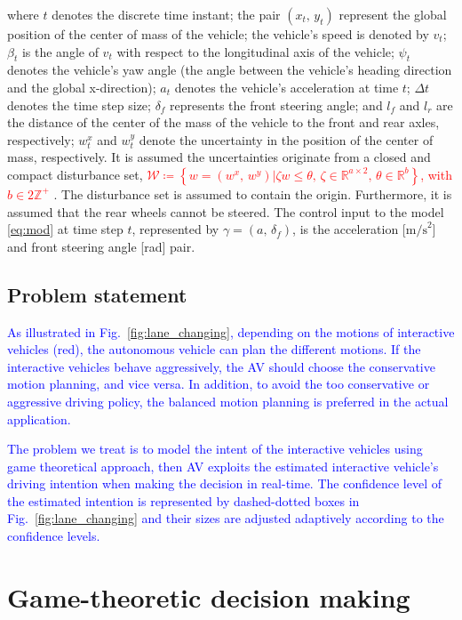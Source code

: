 \documentclass[10pt,journal]{IEEEtran}
\begin{document}
	
	\noindent where  $t$ denotes the discrete time instant; the pair $\left(x_t,\,y_t\right)$  represent the global position of the center of mass of the vehicle; the vehicle's speed is denoted by $v_t$; $\beta_t$ is the angle of $v_t$ with respect to the longitudinal axis of the vehicle; $\psi_t$ denotes the vehicle’s yaw angle (the angle between the vehicle’s heading direction and the global x-direction); $a_t$ denotes the vehicle’s acceleration at time $t$;  $\Delta t$ denotes the time step size; $\delta_f$  represents the front steering angle; and  $l_f$  and $l_r$  are the distance of the center of the mass of the vehicle to the front and rear axles, respectively; $w^x_t$  and $w^y_t$ denote the uncertainty in the position of the center of mass, respectively. It is assumed the uncertainties originate from a closed and compact disturbance set, \textcolor{red}{ ${\mathcal{W}} \coloneqq  \left\{ w = \left(w^x,\,w^y\right) |\zeta w\leq\theta,\,\zeta\in\mathbb{R}^{a\times 2},\,\theta\in\mathbb{R}^{b}\right\}$, with $b \in 2\mathbb{Z}^{+}$ }. The disturbance set is assumed to contain the origin. Furthermore, it is assumed that the rear wheels cannot be steered. The control input to the model \eqref{eq:mod} at time step $t$, represented by $\gamma = \left(a ,\, \delta_f \right)$, is the acceleration [$\text{m/s}^2$] and front steering angle [rad] pair. 
	
	\subsection{Problem statement}
	\textcolor{blue}{As illustrated in Fig.~\ref{fig:lane_changing}, depending on the motions of interactive vehicles (red), the autonomous vehicle can plan the different motions. If the interactive vehicles behave aggressively, the AV should choose the conservative motion planning, and vice versa. In addition, to avoid the too conservative or aggressive driving policy, the balanced motion planning is preferred in the actual application.
	}
	
	\textcolor{blue}{The problem we treat is to model the intent of the interactive vehicles using game theoretical approach, then AV exploits the estimated interactive vehicle's driving intention when making the decision in real-time. The confidence level of the estimated intention is represented by dashed-dotted boxes in Fig.~\ref{fig:lane_changing} and their sizes are adjusted adaptively according to the confidence levels.}
	\section{Game-theoretic decision making}
	\label{sec:controller}
	
\end{document}
